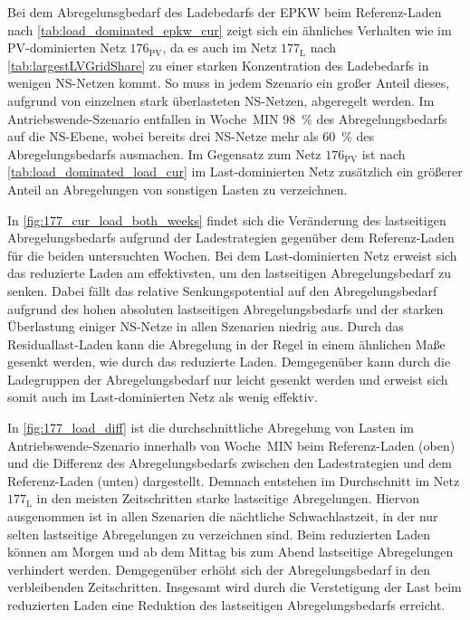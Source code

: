 



Bei dem Abregelunsgbedarf des Ladebedarfs der \gls{EPKW} beim Referenz-Laden nach \autoref{tab:load_dominated_epkw_cur} zeigt sich ein ähnliches Verhalten wie im \gls{PV}-dominierten Netz \(176_{\text{PV}}\), da es auch im Netz \(177_{\text{L}}\) nach \autoref{tab:largestLVGridShare} zu einer starken Konzentration des Ladebedarfs in wenigen \gls{NS}-Netzen kommt.
So muss in jedem Szenario ein großer Anteil dieses, aufgrund von einzelnen stark überlasteten \gls{NS}-Netzen, abgeregelt werden.
Im Antriebswende-Szenario entfallen in Woche~MIN \SI{98}{\percent} des Abregelungsbedarfs auf die \gls{NS}-Ebene, wobei bereits drei \gls{NS}-Netze mehr als \SI{60}{\percent} des Abregelungsbedarfs ausmachen.
Im Gegensatz zum Netz \(176_{\text{PV}}\) ist nach \autoref{tab:load_dominated_load_cur} im Last-dominierten Netz zusätzlich ein größerer Anteil an Abregelungen von sonstigen Lasten zu verzeichnen.





In \autoref{fig:177_cur_load_both_weeks} findet sich die Veränderung des lastseitigen Abregelungsbedarfs aufgrund der Ladestrategien gegenüber dem Referenz-Laden für die beiden untersuchten Wochen.
Bei dem Last-dominierten Netz erweist sich das reduzierte Laden am effektivsten, um den lastseitigen Abregelungsbedarf zu senken.
Dabei fällt das relative Senkungspotential auf den Abregelungsbedarf aufgrund des hohen absoluten lastseitigen Abregelungsbedarfs und der starken Überlastung einiger \gls{NS}-Netze in allen Szenarien niedrig aus.
Durch das Residuallast-Laden kann die Abregelung in der Regel in einem ähnlichen Maße gesenkt werden, wie durch das reduzierte Laden.
Demgegenüber kann durch die Ladegruppen der Abregelungsbedarf nur leicht gesenkt werden und erweist sich somit auch im Last-dominierten Netz als wenig effektiv.



In \autoref{fig:177_load_diff} ist die durchschnittliche Abregelung von Lasten im Antriebswende-Szenario innerhalb von Woche~MIN beim Referenz-Laden (oben) und die Differenz des Abregelungsbedarfs zwischen den Ladestrategien und dem Referenz-Laden (unten) dargestellt.
Demnach entstehen im Durchschnitt im Netz \(177_{\text{L}}\) in den meisten Zeitschritten starke lastseitige Abregelungen.
Hiervon ausgenommen ist in allen Szenarien die nächtliche Schwachlastzeit, in der nur selten lastseitige Abregelungen zu verzeichnen sind.
Beim reduzierten Laden können am Morgen und ab dem Mittag bis zum Abend lastseitige Abregelungen verhindert werden.
Demgegenüber erhöht sich der Abregelungsbedarf in den verbleibenden Zeitschritten.
Insgesamt wird durch die Verstetigung der Last beim reduzierten Laden eine Reduktion des lastseitigen Abregelungsbedarfs erreicht.

